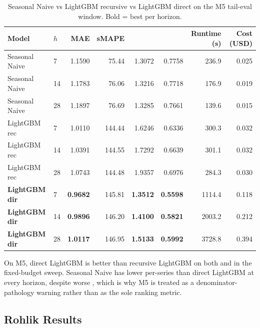 \begin{table}[htbp]
\centering
\caption{Seasonal Naive vs LightGBM recursive vs LightGBM direct on the M5
tail-eval window.  Bold = best per horizon.}
\label{tab:t53}
\small
\begin{tabular}{llrrrrrr}
\toprule
Model & $h$ & MAE & sMAPE & \WAPE{} & \textbf{\WRMSSE{}} & Runtime (s) & Cost (USD) \\
\midrule
Seasonal Naive &  7 & 1.1590 &  75.44 & 1.3072 & 0.7758 &  236.9 & 0.025 \\
Seasonal Naive & 14 & 1.1783 &  76.06 & 1.3216 & 0.7718 &  176.9 & 0.019 \\
Seasonal Naive & 28 & 1.1897 &  76.69 & 1.3285 & 0.7661 &  139.6 & 0.015 \\
LightGBM rec   &  7 & 1.0110 & 144.44 & 1.6246 & 0.6336 &  300.3 & 0.032 \\
LightGBM rec   & 14 & 1.0391 & 144.55 & 1.7292 & 0.6639 &  301.1 & 0.032 \\
LightGBM rec   & 28 & 1.0743 & 144.48 & 1.9357 & 0.6976 &  284.3 & 0.030 \\
\textbf{LightGBM dir} &  7 & \textbf{0.9682} & 145.81 & \textbf{1.3512} & \textbf{0.5598} & 1114.4 & 0.118 \\
\textbf{LightGBM dir} & 14 & \textbf{0.9896} & 146.20 & \textbf{1.4100} & \textbf{0.5821} & 2003.2 & 0.212 \\
\textbf{LightGBM dir} & 28 & \textbf{1.0117} & 146.95 & \textbf{1.5133} & \textbf{0.5992} & 3728.8 & 0.394 \\
\bottomrule
\end{tabular}
\end{table}

On M5, direct LightGBM is better than recursive LightGBM on both \WAPE{}
and \WRMSSE{} in the fixed-budget sweep.  Seasonal Naive has lower
per-series \WAPE{} than direct LightGBM at every horizon, despite worse
\WRMSSE{}, which is why M5 \WAPE{} is treated as a denominator-pathology
warning rather than as the sole ranking metric.

\subsection{Rohlik Results}


